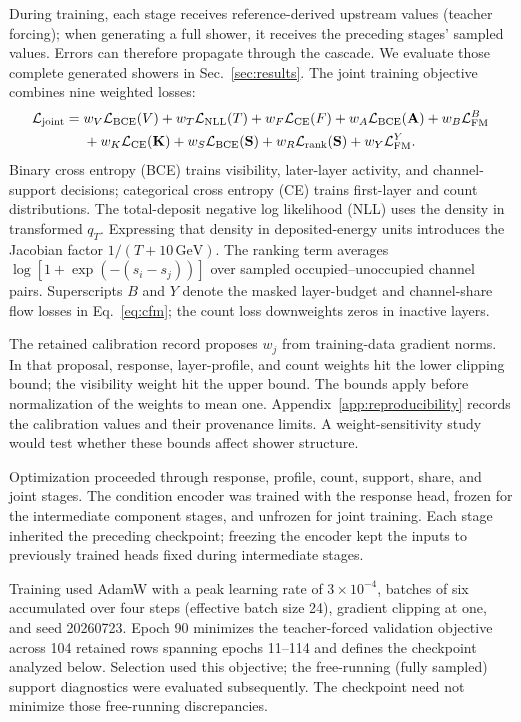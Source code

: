 \documentclass[10pt]{article}
\newcommand{\GeV}{\,\mathrm{GeV}}
\begin{document}
During training, each stage receives reference-derived upstream values (teacher forcing); when generating a full shower, it receives the preceding stages' sampled values. Errors can therefore propagate through the cascade. We evaluate those complete generated showers in Sec.~\ref{sec:results}. The joint training objective combines nine weighted losses:
\begin{equation}
 \begin{aligned}
 \mathcal L_{\rm joint}={}&w_V\mathcal L_{\rm BCE}(V)
 +w_T\mathcal L_{\rm NLL}(T)
 +w_F\mathcal L_{\rm CE}(F)
 +w_A\mathcal L_{\rm BCE}(\mathbf A)
 +w_B\mathcal L_{\rm FM}^{B}\\
 &+w_K\mathcal L_{\rm CE}(\mathbf K)
 +w_S\mathcal L_{\rm BCE}(\mathbf S)
 +w_R\mathcal L_{\rm rank}(\mathbf S)
 +w_Y\mathcal L_{\rm FM}^{Y}.
 \end{aligned}
 \label{eq:joint_loss}
\end{equation}
Binary cross entropy (BCE) trains visibility, later-layer activity, and channel-support decisions; categorical cross entropy (CE) trains first-layer and count distributions. The total-deposit negative log likelihood (NLL) uses the density in transformed $q_T$. Expressing that density in deposited-energy units introduces the Jacobian factor $1/(T+10\GeV)$. The ranking term averages $\log[1+\exp(-(s_i-s_j))]$ over sampled occupied--unoccupied channel pairs. Superscripts $B$ and $Y$ denote the masked layer-budget and channel-share flow losses in Eq.~\eqref{eq:cfm}; the count loss downweights zeros in inactive layers.

The retained calibration record proposes $w_j$ from training-data gradient norms. In that proposal, response, layer-profile, and count weights hit the lower clipping bound; the visibility weight hit the upper bound. The bounds apply before normalization of the weights to mean one. Appendix~\ref{app:reproducibility} records the calibration values and their provenance limits. A weight-sensitivity study would test whether these bounds affect shower structure.

Optimization proceeded through response, profile, count, support, share, and joint stages. The condition encoder was trained with the response head, frozen for the intermediate component stages, and unfrozen for joint training. Each stage inherited the preceding checkpoint; freezing the encoder kept the inputs to previously trained heads fixed during intermediate stages.

Training used AdamW with a peak learning rate of $3\times10^{-4}$, batches of six accumulated over four steps (effective batch size 24), gradient clipping at one, and seed 20260723. Epoch 90 minimizes the teacher-forced validation objective across 104 retained rows spanning epochs 11--114 and defines the checkpoint analyzed below. Selection used this objective; the free-running (fully sampled) support diagnostics were evaluated subsequently. The checkpoint need not minimize those free-running discrepancies.
\end{document}
